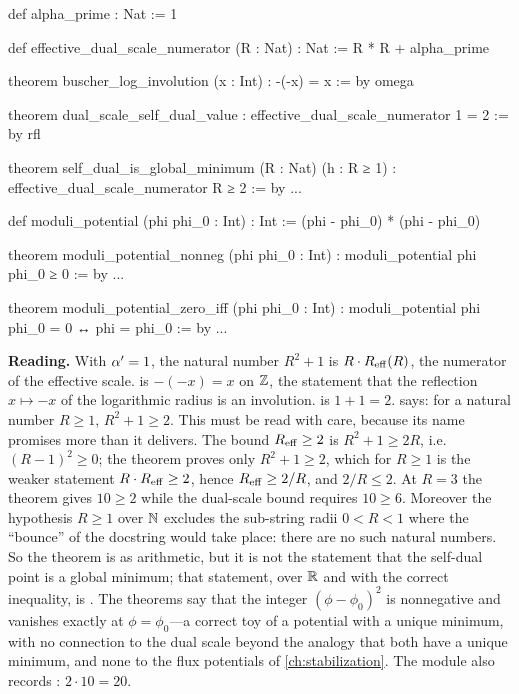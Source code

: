 \begin{leanbox}
\begin{leancode}
def alpha_prime : Nat := 1

def effective_dual_scale_numerator (R : Nat) : Nat := R * R + alpha_prime

theorem buscher_log_involution (x : Int) : -(-x) = x := by omega

theorem dual_scale_self_dual_value : effective_dual_scale_numerator 1 = 2 := by rfl

theorem self_dual_is_global_minimum (R : Nat) (h : R ≥ 1) :
    effective_dual_scale_numerator R ≥ 2 := by ...

def moduli_potential (phi phi_0 : Int) : Int := (phi - phi_0) * (phi - phi_0)

theorem moduli_potential_nonneg (phi phi_0 : Int) :
    moduli_potential phi phi_0 ≥ 0 := by ...

theorem moduli_potential_zero_iff (phi phi_0 : Int) :
    moduli_potential phi phi_0 = 0 ↔ phi = phi_0 := by ...
\end{leancode}
\textbf{Reading.} With $\alpha'=1$, the natural number $R^2+1$ is $R\cdot R_{\rm eff}(R)$, the
numerator of the effective scale.  is $-(-x)=x$ on $\mathbb{Z}$, the
statement that the reflection $x\mapsto-x$ of the logarithmic radius is an involution.
 is $1+1=2$. 
says: for a natural number $R\ge1$, $R^2+1\ge2$. This must be read with care, because its name
promises more than it delivers. The bound $R_{\rm eff}\ge2$ is $R^2+1\ge2R$, i.e.
$(R-1)^2\ge0$; the theorem proves only $R^2+1\ge2$, which for $R\ge1$ is the weaker
statement $R\cdot R_{\rm eff}\ge2$, hence $R_{\rm eff}\ge2/R$, and $2/R\le2$. At $R=3$ the
theorem gives $10\ge2$ while the dual-scale bound requires $10\ge6$. Moreover the hypothesis
$R\ge1$ over $\mathbb{N}$ excludes the sub-string radii $0<R<1$ where the ``bounce'' of the docstring
would take place: there are no such natural numbers. So the theorem is \TA{} as arithmetic,
but it is not the statement that the self-dual point is a global minimum; that statement, over
$\mathbb{R}$ and with the correct inequality, is . The
 theorems say that the integer $(\phi-\phi_0)^2$ is nonnegative and
vanishes exactly at $\phi=\phi_0$---a correct toy of a potential with a unique minimum, with no
connection to the dual scale beyond the analogy that both have a unique minimum, and none to
the flux potentials of \cref{ch:stabilization}. The module also records
: $2\cdot10=20$.
\end{leanbox}


